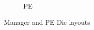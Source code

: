 \documentclass[journal]{IEEEtran}
\begin{document}
\begin{figure}
\begin{subfigure}{.25\textwidth}
  \captionsetup{justification=centering, width=.8\linewidth}
  \caption{PE}
  \label{fig:peLayout}
\end{subfigure}
\captionsetup{justification=centering, width=.9\linewidth}
\caption{Manager and PE Die layouts}
\label{fig:Manager and PE Die layouts}
\end{figure}


\end{document}
